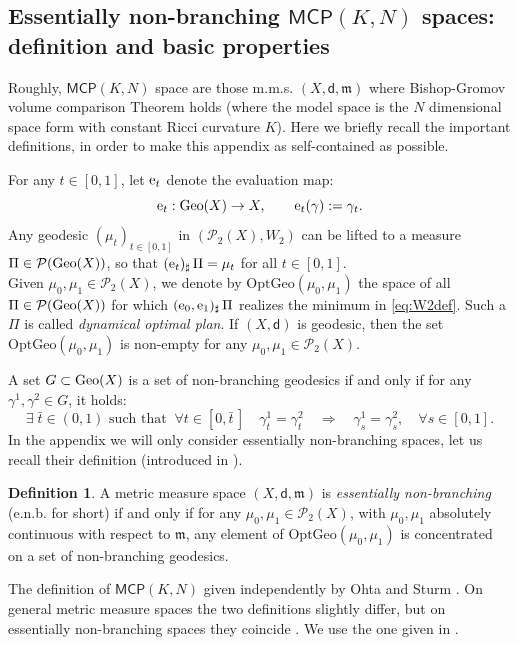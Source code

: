 \documentclass[a4paper]{amsart}
\theoremstyle{plain}
\theoremstyle{definition}
\newtheorem{definition}[lemma]{Definition}
\numberwithin{equation}{section}
\newcommand{\Geo}{{\rm Geo}}
\newcommand{\MCP}{\mathsf{MCP}}
\newcommand{\mm}{\mathfrak m}
\newcommand{\sfd}{\mathsf d}
\newcommand{\Opt}{\mathrm{OptGeo}}
\begin{document}
{{\subsection{Essentially non-branching $\MCP(K,N)$ spaces: definition and basic properties}
Roughly, $\MCP(K,N)$ space are those m.m.s. $(X,\sfd,\mm)$ where Bishop-Gromov volume comparison Theorem holds (where the model space is the $N$ dimensional space form with constant Ricci curvature $K$). Here we briefly recall the important definitions, in order to make this appendix as self-contained as possible.  
\medskip


 For any $t\in [0,1]$,  let ${\rm e}_{t}$ denote the evaluation map: 
%
$$
  {\rm e}_{t} : \Geo(X) \to X, \qquad {\rm e}_{t}(\gamma) : = \gamma_{t}.
$$
Any geodesic $(\mu_t)_{t \in [0,1]}$ in $(\mathcal{P}_2(X), W_2)$  can be lifted to a measure $\Pi \in {\mathcal {P}}(\Geo(X))$, 
so that $({\rm e}_t)_\sharp \, \Pi = \mu_t$ for all $t \in [0,1]$. 
\\Given $\mu_{0},\mu_{1} \in \mathcal{P}_{2}(X)$, we denote by 
$\Opt(\mu_{0},\mu_{1})$ the space of all $\Pi \in \mathcal{P}(\Geo(X))$ for which $({\rm e}_0,{\rm e}_1)_\sharp\, \Pi$ 
realizes the minimum in \eqref{eq:W2def}. Such a $\Pi$ is called \emph{dynamical optimal plan}. If $(X,\sfd)$ is geodesic, then the set  $\Opt(\mu_{0},\mu_{1})$ is non-empty for any $\mu_0,\mu_1\in \mathcal{P}_2(X)$.
\medskip

A set $G \subset \Geo(X)$ is a set of non-branching geodesics if and only if for any $\gamma^{1},\gamma^{2} \in G$, it holds:
%
$$
\exists \;  \bar t\in (0,1) \text{ such that } \ \forall t \in [0, \bar t\,] \quad  \gamma_{ t}^{1} = \gamma_{t}^{2}   
\quad 
\Longrightarrow 
\quad 
\gamma^{1}_{s} = \gamma^{2}_{s}, \quad \forall s \in [0,1].
$$
%
In the appendix we will only consider essentially non-branching spaces, let us recall their definition (introduced in \cite{rajalasturm}). 
%
\begin{definition}\label{def:ENB}
A metric measure space $(X,\sfd, \mm)$ is \emph{essentially non-branching} (e.n.b. for short) if and only if for any $\mu_{0},\mu_{1} \in \mathcal{P}_{2}(X)$,
with $\mu_{0},\mu_{1}$ absolutely continuous with respect to $\mm$, any element of $\Opt(\mu_{0},\mu_{1})$ is concentrated on a set of non-branching geodesics.
\end{definition}


The definition of $\MCP(K,N)$ given independently by Ohta \cite{ohtmea} and Sturm \cite{sturm:II}. 
On general metric measure spaces the two definitions slightly differ, but on essentially non-branching spaces they coincide \cite[Appendix A]{Mond-Cav-17}. We use the one given in
\cite{ohtmea}.


}}
\end{document}
